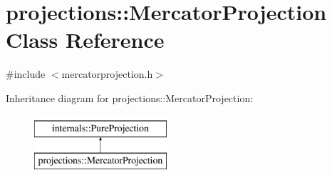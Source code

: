 \hypertarget{classprojections_1_1_mercator_projection}{\section{projections\-:\-:Mercator\-Projection Class Reference}
\label{classprojections_1_1_mercator_projection}
}


{\ttfamily \#include $<$mercatorprojection.\-h$>$}

Inheritance diagram for projections\-:\-:Mercator\-Projection\-:\begin{figure}[H]
\begin{center}
\leavevmode
\includegraphics[height=2.000000cm]{classprojections_1_1_mercator_projection}
\end{center}
\end{figure}
